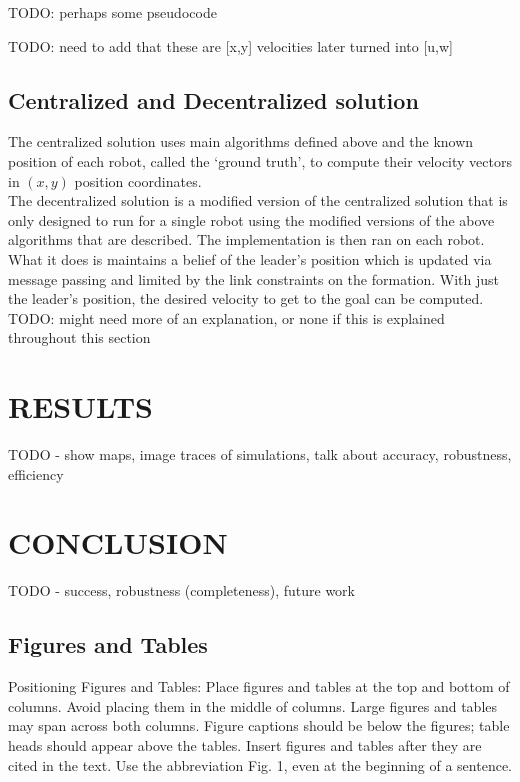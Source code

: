 \documentclass[letterpaper, 10 pt, conference]{ieeeconf}  %
\begin{document}
TODO: perhaps some pseudocode

TODO: need to add that these are [x,y] velocities later turned into [u,w]

\subsection{Centralized and Decentralized solution}

The centralized solution uses main algorithms defined above and the known position of each robot, called the `ground truth', to compute their velocity vectors in $(x,y)$ position coordinates. \\

The decentralized solution is a modified version of the centralized solution that is only designed to run for a single robot using the modified versions of the above algorithms that are described. The implementation is then ran on each robot. What it does is maintains a belief of the leader's position which is updated via message passing and limited by the link constraints on the formation. With just the leader's position, the desired velocity to get to the goal can be computed. \\

TODO: might need more of an explanation, or none if this is explained throughout this section

\section{RESULTS}

TODO - show maps, image traces of simulations, talk about accuracy, robustness, efficiency

\section{CONCLUSION}

TODO - success, robustness (completeness), future work

\subsection{Figures and Tables}

Positioning Figures and Tables: Place figures and tables at the top and bottom of columns. Avoid placing them in the middle of columns. Large figures and tables may span across both columns. Figure captions should be below the figures; table heads should appear above the tables. Insert figures and tables after they are cited in the text. Use the abbreviation Fig. 1, even at the beginning of a sentence.
\end{document}
